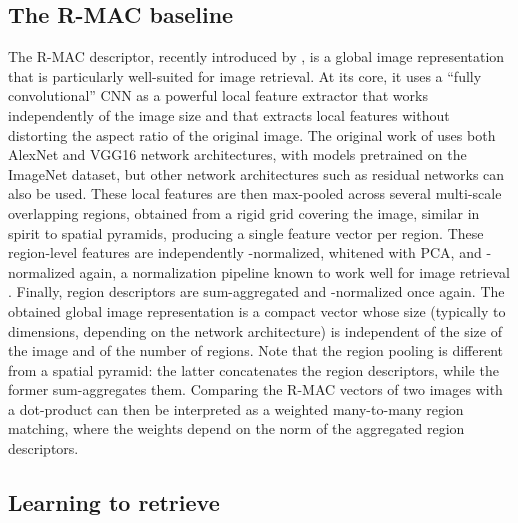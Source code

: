 \documentclass[twocolumn]{svjour3}          \smartqed  \usepackage{graphicx}
\begin{document}
\subsection{The R-MAC baseline}
\label{sec:r-mac}

The R-MAC descriptor, recently introduced by \cite{Tolias2016}, is
a global image representation that is particularly well-suited for image retrieval.
At its core, it uses a ``fully convolutional'' CNN as a powerful local feature extractor that works independently of the image size and that extracts local features without distorting the aspect ratio of the original image.
The original work of \cite{Tolias2016} uses both AlexNet \citep{Krizhevsky2012} and VGG16 \citep{Simonyan2015verydeep} network architectures, with models pretrained on the ImageNet dataset, but other network architectures such as residual networks \citep{He2016} can also be used.
These local features are then max-pooled across several multi-scale overlapping regions, obtained from a rigid grid covering the image, similar in spirit to spatial pyramids, producing a single feature vector per region.
These region-level features are independently -normalized, whitened with PCA, and -normalized again, a normalization pipeline known to work well for image retrieval \citep{Jegou2012}.
Finally, region descriptors are sum-aggregated and -normalized once again.
The obtained global image representation is a compact vector whose size (typically  to  dimensions, depending on the network architecture) is independent of the size of the image and of the number of regions.
Note that the region pooling is different from a spatial pyramid: the latter concatenates the region descriptors, while the former sum-aggregates them.
Comparing the R-MAC vectors of two images with a dot-product can then be interpreted as a weighted many-to-many region matching, where the weights depend on the norm of the aggregated region descriptors.





\subsection{Learning to retrieve}
\label{sec:learning}
\end{document}
